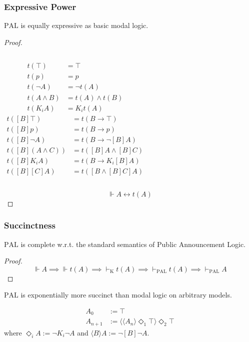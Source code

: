 \documentclass[UTF8,aspectratio=43,11pt,colorlinks,compress,openany]{beamer}%
\begin{document}
\begin{frame}\frametitle{Expressive Power}
\setlength\abovedisplayskip{0pt}
\setlength\belowdisplayskip{0pt}
\begin{theorem}
$\mathrm{PAL}$ is equally expressive as basic modal logic.
\end{theorem}
\begin{proof}
\begin{columns}
\begin{align*}
t(\top)&=\top\\
t(p)&=p\\
t(\neg A)&=\neg t(A)\\
t(A\wedge B)&=t(A)\wedge t(B)\\
t(K_iA)&=K_i t(A)
\end{align*}
\begin{align*}
t([B]\top)&=t(B\to\top)\\
t([B]p)&=t(B\to p)\\
t([B]\neg A)&=t(B\to\neg[B]A)\\
t([B](A\wedge C))&=t([B]A\wedge[B]C)\\
t([B]K_iA)&=t(B\to K_i[B]A)\\
t([B][C]A)&=t([B\wedge[B]C]A)
\end{align*}
\end{columns}
\[\Vdash A\leftrightarrow t(A)\]
\end{proof}
\end{frame}

\begin{frame}\frametitle{Succinctness}
\setlength\abovedisplayskip{0pt}
\setlength\belowdisplayskip{0pt}
\begin{theorem}
$\mathrm{PAL}$ is complete w.r.t. the standard semantics of Public Announcement Logic.
\end{theorem}
\begin{proof}
\[\Vdash A\implies\Vdash t(A)\implies \vdash_{\mathrm{K}} t(A)\implies\vdash_{\mathrm{PAL}}t(A)\implies\vdash_{\mathrm{PAL}}A\]
\end{proof}
\begin{theorem}
$\mathrm{PAL}$ is exponentially more succinct than modal logic on arbitrary
models.
\end{theorem}\vspace{-2ex}
\begin{align*}
 A_0&:=\top\\
 A_{n+1}&:=\langle\langle A_n\rangle\Diamond_1\top\rangle\Diamond_2\top
\end{align*}
where $\Diamond_i A:=\neg K_i\neg A$ and $\langle B\rangle A:=\neg[B]\neg A$.
\end{frame}
\end{document}
